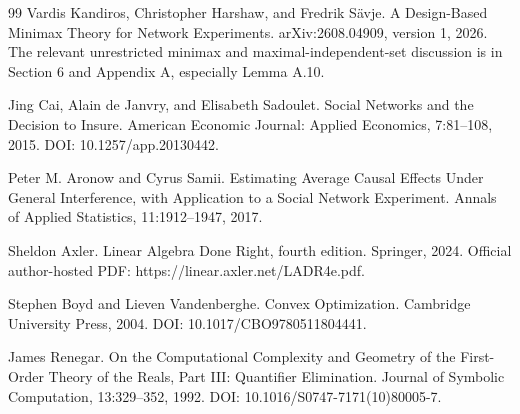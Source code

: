 \documentclass{article}
\begin{document}
\begin{thebibliography}{99}
   Vardis Kandiros, Christopher Harshaw, and Fredrik Sävje. A Design-Based Minimax Theory for Network Experiments. arXiv:2608.04909, version 1, 2026. The relevant unrestricted minimax and maximal-independent-set discussion is in Section 6 and Appendix A, especially Lemma A.10.

   Jing Cai, Alain de Janvry, and Elisabeth Sadoulet. Social Networks and the Decision to Insure. American Economic Journal: Applied Economics, 7:81--108, 2015. DOI: 10.1257/app.20130442.

   Peter M. Aronow and Cyrus Samii. Estimating Average Causal Effects Under General Interference, with Application to a Social Network Experiment. Annals of Applied Statistics, 11:1912--1947, 2017.

   Sheldon Axler. Linear Algebra Done Right, fourth edition. Springer, 2024. Official author-hosted PDF: https://linear.axler.net/LADR4e.pdf.

   Stephen Boyd and Lieven Vandenberghe. Convex Optimization. Cambridge University Press, 2004. DOI: 10.1017/CBO9780511804441.

   James Renegar. On the Computational Complexity and Geometry of the First-Order Theory of the Reals, Part III: Quantifier Elimination. Journal of Symbolic Computation, 13:329--352, 1992. DOI: 10.1016/S0747-7171(10)80005-7.

\end{thebibliography}
\end{document}
